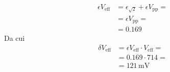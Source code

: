 \documentclass[a4paper]{article}
\begin{document}
				\begin{equation*}
					\begin{split}
						\epsilon V_{\mathrm{eff}} &= \epsilon_{\mathrm{\sqrt{2}}} + \epsilon V_{\mathrm{pp}} = \\
												  &= \epsilon V_{\mathrm{pp}} = \\
												  &= 0.169
					\end{split}
				\end{equation*}
				Da cui
				\begin{equation*}
					\begin{split}
						\delta V_{\mathrm{eff}} &= \epsilon V_{\mathrm{eff}} \cdot V_{\mathrm{eff}} = \\
												&= 0.169 \cdot 714 = \\
												&= 121 \, \mathrm{mV}
					\end{split}
				\end{equation*}
\end{document}
